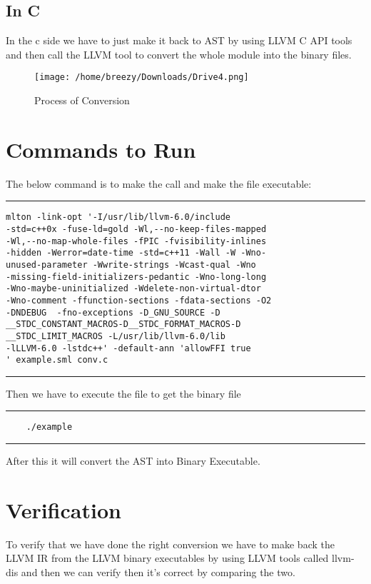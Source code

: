 \documentclass[openany]{book}
\begin{document}
\subsection{In C}
In the c side we have to just make it back to AST by using LLVM C API tools and then call  the LLVM tool to convert the whole module into the binary files.\newline

\begin{figure}[h]
	\texttt{[image: /home/breezy/Downloads/Drive4.png]}
	\caption{Process of Conversion}
	\label{fig:4.1}
\end{figure} \newpage

\section{Commands to Run}
The below command is to make the call and make the file executable: \newline
\noindent\rule{12cm}{0.4pt}

\begin{verbatim}
mlton -link-opt '-I/usr/lib/llvm-6.0/include
-std=c++0x -fuse-ld=gold -Wl,--no-keep-files-mapped
-Wl,--no-map-whole-files -fPIC -fvisibility-inlines
-hidden -Werror=date-time -std=c++11 -Wall -W -Wno-
unused-parameter -Wwrite-strings -Wcast-qual -Wno
-missing-field-initializers-pedantic -Wno-long-long
-Wno-maybe-uninitialized -Wdelete-non-virtual-dtor 
-Wno-comment -ffunction-sections -fdata-sections -O2
-DNDEBUG  -fno-exceptions -D_GNU_SOURCE -D
__STDC_CONSTANT_MACROS-D__STDC_FORMAT_MACROS-D
__STDC_LIMIT_MACROS -L/usr/lib/llvm-6.0/lib 
-lLLVM-6.0 -lstdc++' -default-ann 'allowFFI true
' example.sml conv.c
\end{verbatim}
\noindent\rule{12cm}{0.4pt}\newline \newline

Then we have to execute the file to get the binary file

\noindent\rule{12cm}{0.4pt}

\begin{verbatim}
	./example
\end{verbatim}

\noindent\rule{12cm}{0.4pt}

After this it will convert the AST into Binary Executable.

\newpage

\section{Verification}
To verify that we have done the right conversion we have to make back the LLVM IR from the LLVM binary executables by using LLVM tools called llvm-dis and then we can verify then it's correct by comparing the two.
\end{document}
